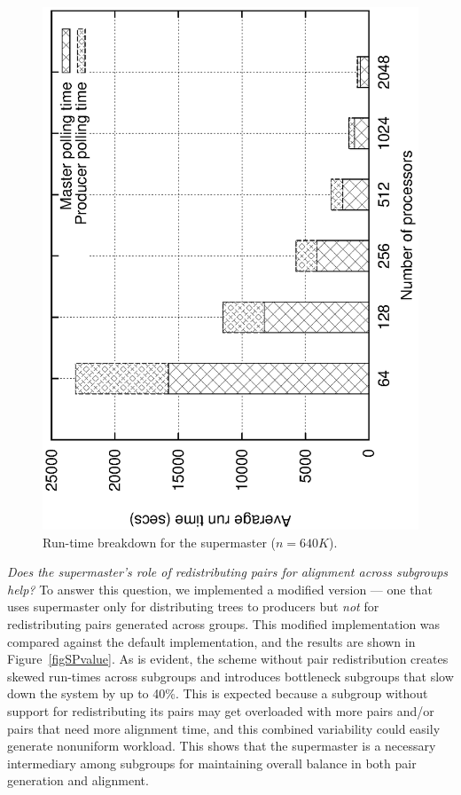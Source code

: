 \documentclass[10pt,journal,letterpaper,compsoc]{IEEEtran}
\begin{document}
\begin{figure}[tb]
\centerline{
						\includegraphics[angle=-90, scale=0.5]{spBreak.eps}
            }
\caption{
Run-time breakdown for the supermaster ($n=640K$).
}
\label{figSupermasterBreakdown}
\end{figure}


\emph{Does the supermaster's role of redistributing pairs for alignment across subgroups help?} To answer this question, we implemented a modified version --- one that uses supermaster only for distributing trees to producers but \emph{not} for redistributing pairs generated across groups. This modified implementation was compared against the default implementation, and the results are shown in Figure~\ref{figSPvalue}. As is evident, the scheme without pair redistribution creates skewed run-times across subgroups and introduces bottleneck subgroups that slow down the system by up to 40\%. This is expected because a subgroup without support for redistributing its pairs may get overloaded with more pairs and/or pairs that need more alignment time, and this combined variability could easily generate nonuniform workload. This shows that the supermaster is a necessary intermediary among subgroups for maintaining overall balance in both pair generation and alignment.
\end{document}

